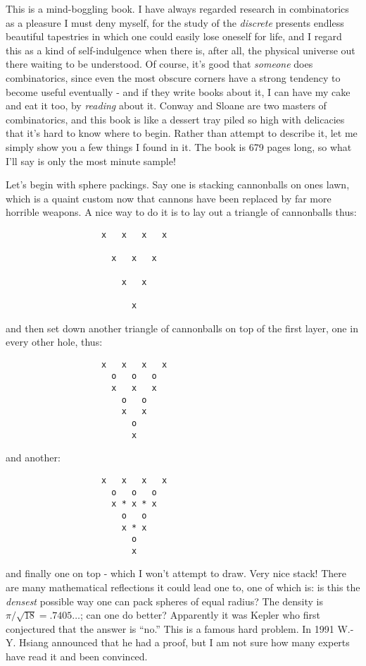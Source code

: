 \documentclass{article}
\begin{document}
This is a mind-boggling book. I have always regarded research in
combinatorics as a pleasure I must deny myself, for the study of the
\emph{discrete} presents endless beautiful tapestries in which one could
easily lose oneself for life, and I regard this as a kind of
self-indulgence when there is, after all, the physical universe out
there waiting to be understood. Of course, it's good that \emph{someone}
does combinatorics, since even the most obscure corners have a strong
tendency to become useful eventually - and if they write books about it,
I can have my cake and eat it too, by \emph{reading} about it. Conway
and Sloane are two masters of combinatorics, and this book is like a
dessert tray piled so high with delicacies that it's hard to know where
to begin. Rather than attempt to describe it, let me simply show you a
few things I found in it. The book is 679 pages long, so what I'll say
is only the most minute sample!

Let's begin with sphere packings. Say one is stacking cannonballs on
ones lawn, which is a quaint custom now that cannons have been replaced
by far more horrible weapons. A nice way to do it is to lay out a
triangle of cannonballs thus:

\begin{verbatim}
                   x   x   x   x

                     x   x   x

                       x   x

                         x
\end{verbatim}

and then set down another triangle of cannonballs on top of the first
layer, one in every other hole, thus:

\begin{verbatim}
                   x   x   x   x
                     o   o   o
                     x   x   x
                       o   o
                       x   x
                         o
                         x
\end{verbatim}

and another:

\begin{verbatim}
                   x   x   x   x
                     o   o   o
                     x * x * x
                       o   o
                       x * x
                         o
                         x
\end{verbatim}

and finally one on top - which I won't attempt to draw. Very nice stack!
There are many mathematical reflections it could lead one to, one of
which is: is this the \emph{densest} possible way one can pack spheres
of equal radius? The density is \(\pi/\sqrt{18} = .7405\ldots\); can one
do better? Apparently it was Kepler who first conjectured that the
answer is ``no.'' This is a famous hard problem. In 1991 W.-Y. Hsiang
announced that he had a proof, but I am not sure how many experts have
read it and been convinced.
\end{document}
